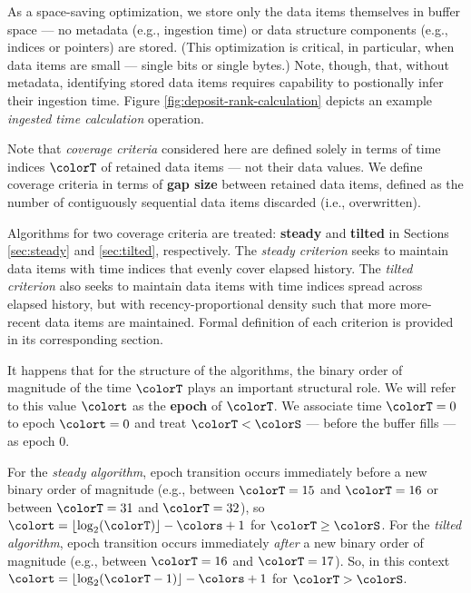 As a space-saving optimization, we store only the data items themselves in buffer space --- no metadata (e.g., ingestion time) or data structure components (e.g., indices or pointers) are stored.
(This optimization is critical, in particular, when data items are small --- single bits or single bytes.)
Note, though, that, without metadata, identifying stored data items requires capability to postionally infer their ingestion time.
Figure \ref{fig:deposit-rank-calculation} depicts an example \textit{ingested time calculation} operation.

Note that \textit{coverage criteria} considered here are defined solely in terms of time indices $\colorT$ of retained data items --- not their data values.
We define coverage criteria in terms of \textbf{gap size} between retained data items, defined as the number of contiguously sequential data items discarded (i.e., overwritten).

Algorithms for two coverage criteria are treated: \textbf{steady} and \textbf{tilted} in Sections \ref{sec:steady} and \ref{sec:tilted}, respectively.
The \textit{steady criterion} seeks to maintain data items with time indices that evenly cover elapsed history.
The \textit{tilted criterion} also seeks to maintain data items with time indices spread across elapsed history, but with recency-proportional density such that more more-recent data items are maintained.
Formal definition of each criterion is provided in its corresponding section.

It happens that for the structure of the algorithms, the binary order of magnitude of the time $\colorT$ plays an important structural role.
We will refer to this value $\colort$ as the \textbf{epoch} of $\colorT$.
We associate time $\colorT=0$ to epoch $\colort=0$ and treat $\colorT < \colorS$ --- before the buffer fills --- as epoch 0.

For the \textit{steady algorithm}, epoch transition occurs immediately before a new binary order of magnitude (e.g., between $\colorT = 15$ and $\colorT = 16$ or between $\colorT = 31$ and $\colorT = 32$), so $\colort = \left\lfloor \log_2(\colorT) \right\rfloor - \colors + 1$ for $\colorT \geq \colorS$.
For the \textit{tilted algorithm}, epoch transition occurs immediately \textit{after} a new binary order of magnitude (e.g., between $\colorT = 16$ and $\colorT = 17$).
So, in this context $\colort = \left\lfloor \log_2(\colorT - 1) \right\rfloor - \colors + 1$ for $\colorT > \colorS$.



